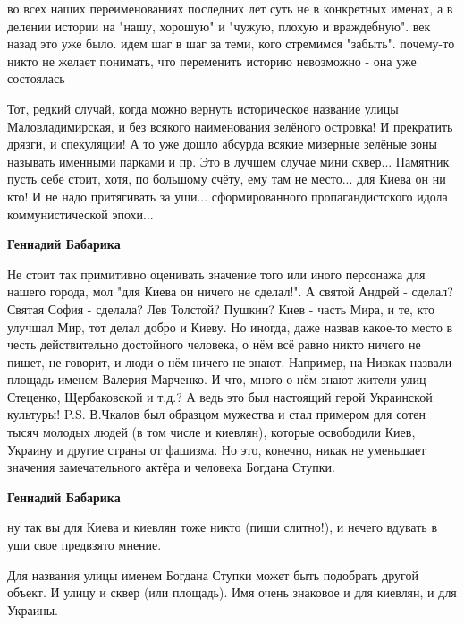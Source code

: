 \begin{itemize}
во всех наших переименованиях последних лет суть не в конкретных именах, а в
делении истории на "нашу, хорошую" и "чужую, плохую и враждебную". век назад
это уже было. идем шаг в шаг за теми, кого стремимся "забыть". почему-то никто
не желает понимать, что переменить историю невозможно - она уже состоялась


Тот, редкий случай, когда можно вернуть историческое название улицы
Маловладимирская, и без всякого наименования зелёного островка! И прекратить
дрязги, и спекуляции! А то уже дошло абсурда всякие мизерные зелёные зоны
называть именными парками и пр. Это в лучшем случае мини сквер... Памятник
пусть себе стоит, хотя, по большому счёту, ему там не место... для Киева он ни
кто! И не надо притягивать за уши... сформированного пропагандистского идола
коммунистической эпохи...

\begin{itemize} %
\textbf{Геннадий Бабарика} 

Не стоит так примитивно оценивать значение того или иного персонажа для нашего
города, мол "для Киева он ничего не сделал!". А святой Андрей - сделал? Святая
София - сделала? Лев Толстой? Пушкин? Киев - часть Мира, и те, кто улучшал Мир,
тот делал добро и Киеву. Но иногда, даже назвав какое-то место в честь
действительно достойного человека, о нём всё равно никто ничего не пишет, не
говорит, и люди о нём ничего не знают. Например, на Нивках назвали площадь
именем Валерия Марченко. И что, много о нём знают жители улиц Стеценко,
Щербаковской и т.д.? А ведь это был настоящий герой Украинской культуры! P.S.
В.Чкалов был образцом мужества и стал примером для сотен тысяч молодых людей (в
том числе и киевлян), которые освободили Киев, Украину и другие страны от
фашизма. Но это, конечно, никак не уменьшает значения замечательного актёра и
человека Богдана Ступки.

\textbf{Геннадий Бабарика} 

ну так вы для Киева и киевлян тоже никто (пиши слитно!), и нечего вдувать в уши
свое предвзято мнение.


Для названия улицы именем Богдана Ступки может быть подобрать другой объект. И
улицу и сквер (или площадь). Имя очень знаковое и для киевлян, и для Украины.

\end{itemize} %



\end{itemize}
